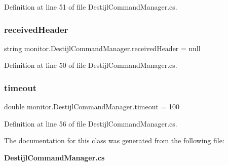 Definition at line 51 of file Destijl\+Command\+Manager.\+cs.

\mbox{\label{classmonitor_1_1_destijl_command_manager_a1b99d771e7af8ffc8ced10d35e5e77ce}} 
\subsubsection{received\+Header}
{\footnotesize\ttfamily string monitor.\+Destijl\+Command\+Manager.\+received\+Header = null\hspace{0.3cm}{\ttfamily [private]}}



Definition at line 50 of file Destijl\+Command\+Manager.\+cs.

\mbox{\label{classmonitor_1_1_destijl_command_manager_a86a1fb03dc480dab8d6758aa0d675cd3}} 
\subsubsection{timeout}
{\footnotesize\ttfamily double monitor.\+Destijl\+Command\+Manager.\+timeout = 100}



Definition at line 56 of file Destijl\+Command\+Manager.\+cs.



The documentation for this class was generated from the following file\+:\begin{DoxyCompactItemize}
\item 
\textbf{ Destijl\+Command\+Manager.\+cs}\end{DoxyCompactItemize}
